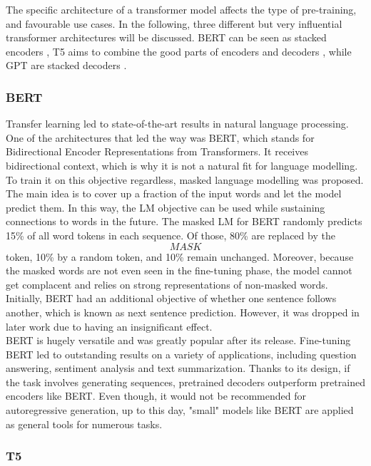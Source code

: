 \documentclass[
]{krantz}
\begin{document}
The specific architecture of a transformer model affects the type of
pre-training, and favourable use cases. In the following, three
different but very influential transformer architectures will be
discussed. BERT can be seen as stacked encoders \citep{Devlin2018}, T5 aims
to combine the good parts of encoders and decoders \citep{Raffel2019},
while GPT are stacked decoders \citep{Brown2020}.

\hypertarget{bert}{%
\subsubsection{BERT}\label{bert}}

Transfer learning led to state-of-the-art results in natural language
processing. One of the architectures that led the way was BERT, which
stands for Bidirectional Encoder Representations from Transformers. It
receives bidirectional context, which is why it is not a natural fit for
language modelling. To train it on this objective regardless, masked
language modelling was proposed. The main idea is to cover up a fraction
of the input words and let the model predict them. In this way, the LM
objective can be used while sustaining connections to words in the
future. The masked LM for BERT randomly predicts 15\% of all word tokens
in each sequence. Of those, 80\% are replaced by the \[MASK\] token, 10\%
by a random token, and 10\% remain unchanged. Moreover, because the
masked words are not even seen in the fine-tuning phase, the model
cannot get complacent and relies on strong representations of non-masked
words. Initially, BERT had an additional objective of whether one
sentence follows another, which is known as next sentence prediction.
However, it was dropped in later work due to having an insignificant
effect.\\

BERT is hugely versatile and was greatly popular after its release.
Fine-tuning BERT led to outstanding results on a variety of
applications, including question answering, sentiment analysis and text
summarization. Thanks to its design, if the task involves generating
sequences, pretrained decoders outperform pretrained encoders like BERT.
Even though, it would not be recommended for autoregressive generation,
up to this day, "small" models like BERT are applied as general tools
for numerous tasks.

\hypertarget{t5}{%
\subsubsection{T5}\label{t5}}
\end{document}

